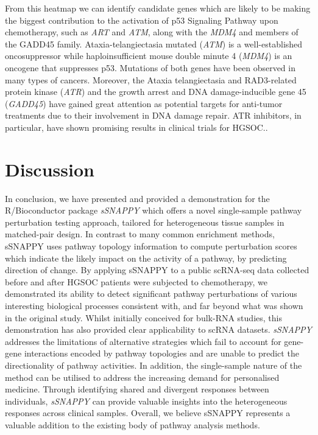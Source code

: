 \documentclass[9pt,a4paper,]{extarticle}
\begin{document}
From this heatmap we can identify candidate genes which are likely to be making the biggest contribution to the activation of p53 Signaling Pathway upon chemotherapy, such as \emph{ART} and \emph{ATM}, along with the \emph{MDM4} and members of the GADD45 family.
Ataxia-telangiectasia mutated (\emph{ATM}) is a well-established oncosuppressor\citep{Moslemi2021} while haploinsufficient mouse double minute 4 (\emph{MDM4}) is an oncogene that suppresses p53\citep{Momand}. Mutations of both genes have been observed in many types of cancers\citep{Choi2016, Gansmo2016, Atwal2009}.
Moreover, the Ataxia telangiectasia and RAD3-related protein kinase (\emph{ATR}) and the growth arrest and DNA damage-inducible gene 45 (\emph{GADD45}) have gained great attention as potential targets for anti-tumor treatments due to their involvement in DNA damage repair\citep{Liebermann2011, Hu2022}.
ATR inhibitors, in particular, have shown promising results in clinical trials for HGSOC.\citep{Li2022, Gong2021}.

\hypertarget{discussion}{%
\section{Discussion}\label{discussion}}

In conclusion, we have presented and provided a demonstration for the R/Bioconductor package \emph{sSNAPPY} which offers a novel single-sample pathway perturbation testing approach, tailored for heterogeneous tissue samples in matched-pair design.
In contrast to many common enrichment methods, sSNAPPY uses pathway topology information to compute perturbation scores which indicate the likely impact on the activity of a pathway, by predicting direction of change.
By applying sSNAPPY to a public scRNA-seq data collected before and after HGSOC patients were subjected to chemotherapy, we demonstrated its ability to detect significant pathway perturbations of various interesting biological processes consistent with, and far beyond what was shown in the original study.
Whilst initially conceived for bulk-RNA studies, this demonstration has also provided clear applicability to scRNA datasets.
\emph{sSNAPPY} addresses the limitations of alternative strategies which fail to account for gene-gene interactions encoded by pathway topologies and are unable to predict the directionality of pathway activities.
In addition, the single-sample nature of the method can be utilised to address the increasing demand for personalised medicine.
Through identifying shared and divergent responses between individuals, \emph{sSNAPPY} can provide valuable insights into the heterogeneous responses across clinical samples.
Overall, we believe sSNAPPY represents a valuable addition to the existing body of pathway analysis methods.
\end{document}
